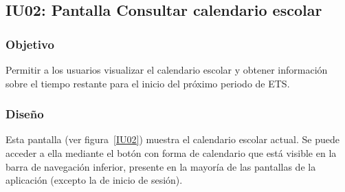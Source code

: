 
\subsection{IU02: Pantalla Consultar calendario escolar}


\newpage

\subsubsection{Objetivo}
Permitir a los usuarios visualizar el calendario escolar y obtener información sobre el tiempo restante para el inicio del próximo periodo de ETS.

\subsubsection{Diseño}
Esta pantalla  (ver figura~\ref{IU02}) muestra el calendario escolar actual. Se puede acceder a ella mediante el botón con forma de calendario que está visible en la barra de navegación inferior, presente en la mayoría de las pantallas de la aplicación (excepto la de inicio de sesión).



